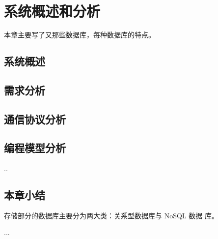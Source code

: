 
\chapter{系统概述和分析}
本章主要写了又那些数据库，每种数据库的特点。
\section{系统概述}
\section{需求分析}
\section{通信协议分析}
\section{编程模型分析}
..
\section{本章小结}
存储部分的数据库主要分为两大类：关系型数据库与 NoSQL 数据
库。

...
